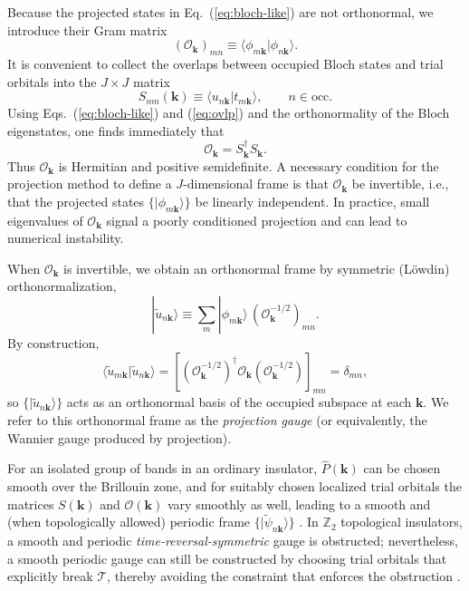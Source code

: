 \documentclass[galley,aps,pra,10pt,amsmath,amssymb,
    superscriptaddress,nofootinbib,longbibliography]{revtex4-2}
\newcounter{comm}
\newcommand{\eq}[1]{Eq.~(\ref{eq:#1})}
\newcommand{\eqs}[2]{Eqs.~(\ref{eq:#1}) and (\ref{eq:#2})}
\begin{document}
Because the projected states in \eq{bloch-like} are not orthonormal, we introduce their Gram matrix
\begin{equation}
\label{eq:O_def}
(\mathcal{O}_{\mathbf{k}})_{mn}
\equiv
\langle \phi_{m\mathbf{k}}|\phi_{n\mathbf{k}}\rangle.
\end{equation}
It is convenient to collect the overlaps between occupied Bloch states and trial orbitals into the $J\times J$ matrix
\begin{equation}
\label{eq:ovlp}
S_{nm}(\mathbf{k})
\equiv
\langle u_{n\mathbf{k}}|t_{m \mathbf{k}}\rangle,
\qquad n\in\mathrm{occ}.
\end{equation}
Using \eqs{bloch-like}{ovlp} and the orthonormality of the Bloch eigenstates, one finds immediately that
\begin{equation}
\label{eq:O_SdagS}
\mathcal{O}_{\mathbf{k}} = S^\dagger_{\mathbf{k}} S_{\mathbf{k}}.
\end{equation}
Thus $\mathcal{O}_{\mathbf{k}}$ is Hermitian and positive semidefinite.
A necessary condition for the projection method to define a $J$-dimensional frame is that $\mathcal{O}_{\mathbf{k}}$ be invertible,
i.e., that the projected states $\{|\phi_{m\mathbf{k}}\rangle\}$ be linearly independent. In practice, small eigenvalues of $\mathcal{O}_{\mathbf{k}}$ signal a poorly conditioned projection and can lead to numerical instability.

When $\mathcal{O}_{\mathbf{k}}$ is invertible, we obtain an orthonormal frame by symmetric (L\"owdin) orthonormalization,
\begin{equation}
\label{eq:tildepsi_from_phi}
|\tilde{u}_{n\mathbf{k}}\rangle
\equiv
\sum_m |\phi_{m\mathbf{k}}\rangle\,(\mathcal{O}^{-1/2}_{\mathbf{k}})_{mn}.
\end{equation}
By construction,
\begin{equation}
\langle \tilde{u}_{m\mathbf{k}}|\tilde{u}_{n\mathbf{k}}\rangle
=
[(\mathcal{O}^{-1/2}_{\mathbf{k}})^\dagger \mathcal{O}_{\mathbf{k}} (\mathcal{O}^{-1/2}_{\mathbf{k}})]_{mn}
=
\delta_{mn},
\end{equation}
so $\{|\tilde{u}_{n\mathbf{k}}\rangle\}$ acts as an orthonormal basis of the occupied subspace at each $\mathbf{k}$.
We refer to this orthonormal frame as the \emph{projection gauge} (or equivalently, the Wannier gauge produced by projection).

For an isolated group of bands in an ordinary insulator, $\hat P(\mathbf{k})$ can be chosen smooth over the Brillouin zone, and for suitably chosen localized trial orbitals the matrices $S(\mathbf{k})$ and $\mathcal{O}(\mathbf{k})$ vary smoothly as well,
leading to a smooth and (when topologically allowed) periodic frame $\{|\tilde{\psi}_{n\mathbf{k}}\rangle\}$
\cite{marzari1997, marzari2012}. In $\mathbb{Z}_2$ topological insulators, a smooth and periodic \emph{time-reversal-symmetric} gauge is obstructed; nevertheless, a smooth periodic gauge can still be constructed by choosing trial orbitals that explicitly break $\mathcal{T}$, thereby avoiding the constraint that enforces the obstruction \cite{soluyanov2011}.
\end{document}
